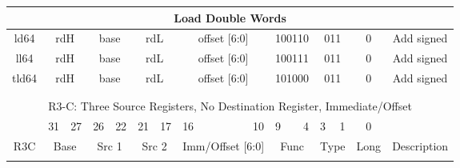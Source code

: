 \documentclass{article}
\begin{document}
\begin{center}
\begin{longtable}{|c|l|r|l|r|l|r|l|r|l|r|l|r|c|c|}
                    \multicolumn{15}{|c|}{Load Double Words} \\ 
    \hline ld64 &   \multicolumn{2}{|c|}{rdH}       &   \multicolumn{2}{|c|}{base}      &   \multicolumn{2}{|c|}{rdL}       &   \multicolumn{2}{|c|}{offset [6:0]}      &   \multicolumn{2}{|c|}{100110}    &   \multicolumn{2}{|c|}{011}       &   0       &   Add signed \\
    \hline ll64 &   \multicolumn{2}{|c|}{rdH}       &   \multicolumn{2}{|c|}{base}      &   \multicolumn{2}{|c|}{rdL}       &   \multicolumn{2}{|c|}{offset [6:0]}      &   \multicolumn{2}{|c|}{100111}    &   \multicolumn{2}{|c|}{011}       &   0       &   Add signed \\
    \hline tld64 &  \multicolumn{2}{|c|}{rdH}       &   \multicolumn{2}{|c|}{base}      &   \multicolumn{2}{|c|}{rdL}       &   \multicolumn{2}{|c|}{offset [6:0]}      &   \multicolumn{2}{|c|}{101000}    &   \multicolumn{2}{|c|}{011}       &   0       &   Add signed \\

    \hline          \multicolumn{15}{c}{} \\
    
    
                    \multicolumn{15}{c}{} \\
    
                    \multicolumn{15}{c}{R3-C: Three Source Registers, No Destination Register, Immediate/Offset} \\ 
    \hline      &   \multicolumn{1}{l}{31}  &   27      &   \multicolumn{1}{l}{26}  &   22  &   \multicolumn{1}{l}{21}  &   17      &   \multicolumn{1}{l}{16}  &   10          &   \multicolumn{1}{l}{9}   &   4   &   \multicolumn{1}{l}{3}   &   1   &   0       & \\
    \hline R3C  &   \multicolumn{2}{|c|}{Base}          &   \multicolumn{2}{|c|}{Src 1}     &   \multicolumn{2}{|c|}{Src 2}         &   \multicolumn{2}{|c|}{Imm/Offset [6:0]}  &   \multicolumn{2}{|c|}{Func}      &   \multicolumn{2}{|c|}{Type}      &   Long    &   Description \\
    
    
    \hline          \multicolumn{15}{|c|}{} \\
    

\end{longtable}
\end{center}
\end{document}
